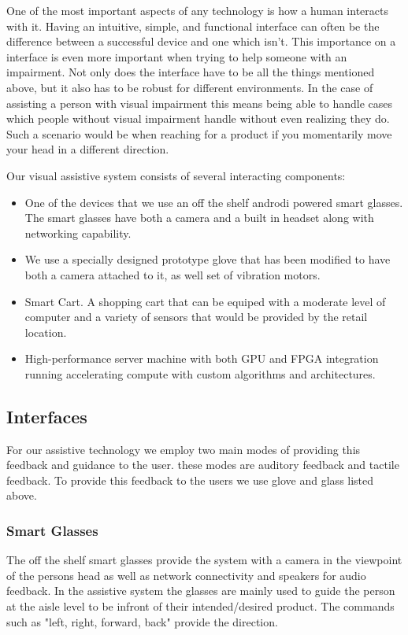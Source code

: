 One of the most important aspects of any technology is how a human interacts with it.
Having an intuitive, simple, and functional interface can often be the difference between
a successful device and one which isn't. This importance on a interface is even more important
when trying to help someone with an impairment. Not only does the interface have to be all
the things mentioned above, but it also has to be robust for different environments. In the
case of assisting a person with visual impairment this means being able to handle cases
which people without visual impairment handle without even realizing they do. Such a scenario
would be when reaching for a product if you momentarily move your head in a different direction.

Our visual assistive system consists of several interacting components: 

\begin{itemize}
\item One of the devices that we use an off the shelf androdi powered smart glasses. 
The smart glasses have both a camera and a built in headset along with
networking capability. 
\item We use a specially designed prototype glove that has been
modified to have both a camera attached to it, as well set of
vibration motors. 
\item Smart Cart. A shopping cart that can be equiped with a moderate level of computer
and a variety of sensors that would be provided by the retail location.
\item High-performance server machine with both GPU and FPGA integration running
accelerating compute with custom algorithms and architectures.
\end{itemize}
\subsection{Interfaces}
For our assistive technology we employ two main modes of providing this feedback and guidance to the user. these modes are auditory feedback and tactile feedback. To provide this feedback to the users we use glove and glass listed above.
\subsubsection{Smart Glasses}
The off the shelf smart glasses provide the system with a camera in the viewpoint
of the persons head as well as network connectivity and speakers for audio feedback.
In the assistive system the glasses are mainly used to guide the person at the aisle level
to be infront of their intended/desired product. The commands such as "left, right, forward, back"
provide the direction. 

